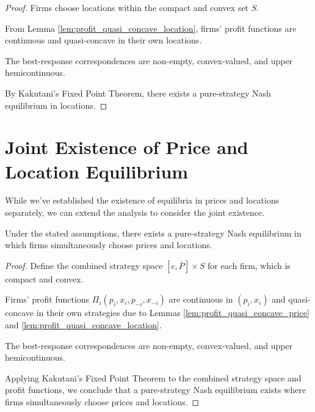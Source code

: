 \begin{proof}
Firms choose locations within the compact and convex set \( S \).

From Lemma \ref{lem:profit_quasi_concave_location}, firms' profit functions are continuous and quasi-concave in their own locations.

The best-response correspondences are non-empty, convex-valued, and upper hemicontinuous.

By Kakutani's Fixed Point Theorem, there exists a pure-strategy Nash equilibrium in locations.
\end{proof}

\section{Joint Existence of Price and Location Equilibrium}

While we've established the existence of equilibria in prices and locations separately, we can extend the analysis to consider the joint existence.

\begin{proposition}
Under the stated assumptions, there exists a pure-strategy Nash equilibrium in which firms simultaneously choose prices and locations.
\end{proposition}

\begin{proof}
Define the combined strategy space \( [c, \overline{P}] \times S \) for each firm, which is compact and convex.

Firms' profit functions \( \Pi_i(p_i, x_i, p_{-i}, x_{-i}) \) are continuous in \( (p_i, x_i) \) and quasi-concave in their own strategies due to Lemmas \ref{lem:profit_quasi_concave_price} and \ref{lem:profit_quasi_concave_location}.

The best-response correspondences are non-empty, convex-valued, and upper hemicontinuous.

Applying Kakutani's Fixed Point Theorem to the combined strategy space and profit functions, we conclude that a pure-strategy Nash equilibrium exists where firms simultaneously choose prices and locations.
\end{proof}